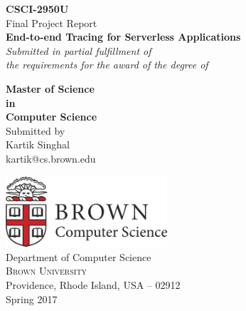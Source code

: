 \begin{titlepage}

\begin{center}

\textup{\small {\bf CSCI-2950U} \\ Final Project Report}\\[0.5in]

\Large \textbf {End-to-end Tracing for Serverless Applications}\\[1in]

       \small \emph{Submitted in partial fulfillment of\\
        the requirements for the award of the degree of}
        \vspace{.4in}

       {\bf Master of Science \\in\\ Computer Science}\\[0.6in]

\normalsize Submitted by \\

\Large Kartik Singhal \\

\normalsize kartik@cs.brown.edu


\vfill

\includegraphics[width=0.45\textwidth]{./brown_cs_logo}\\[0.1in]
\Large{Department of Computer Science}\\
\normalsize
\textsc{Brown University}\\
Providence, Rhode Island, USA -- 02912 \\
\vspace{0.2cm}
Spring 2017

\end{center}

\end{titlepage}
